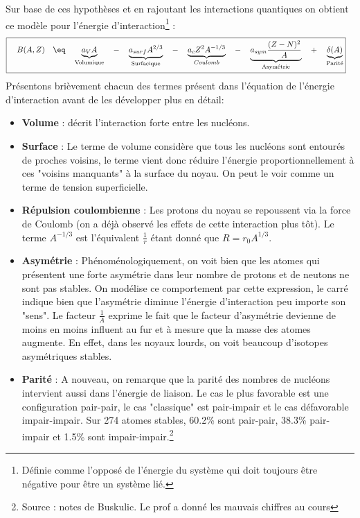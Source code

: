 Sur base de ces hypothèses et en rajoutant les interactions quantiques on obtient ce modèle pour l'énergie d'interaction\footnote{Définie comme l'opposé de l'énergie du système qui doit toujours être négative pour être un système lié.} :
\begin{equation}
\boxed{
    \quad B(A,Z) \quad\eq\quad
    \underbrace{a_V A}_{\text{Volumique}}
    \quad -\quad
    \underbrace{a_{surf} A^{2/3}}_{\text{Surfacique}}
    \quad-\quad
    \underbrace{a_c Z^2 A^{-1/3 }}_{Coulomb}
    \quad-\quad 
    \underbrace{a_{sym}\frac{(Z-N)^2}{A}}_{\text{Asymétrie}}
    \quad+\quad 
    \underbrace{\delta(A)}_{\text{Parité}}}\quad
    \label{B}
\end{equation}
Présentons brièvement chacun des termes présent dans l'équation de l'énergie d'interaction avant de les développer plus en détail:
\begin{itemize}[label = $\bullet$]
    \item \textbf{Volume} : décrit l'interaction forte entre les nucléons.
    
    \item \textbf{Surface} : Le terme de volume considère que tous les nucléons sont entourés de proches voisins, le terme vient donc réduire l'énergie proportionnellement à ces "voisins manquants" à la surface du noyau. On peut le voir comme un terme de tension superficielle.
    
    \item \textbf{Répulsion coulombienne} : Les protons du noyau se repoussent via la force de Coulomb (on a déjà observé les effets de cette interaction plus tôt). Le terme $A^{-1/3}$ est l'équivalent $\frac{1}{r}$ étant donné que $R=r_0A^{1/3}$.
    
    \item \textbf{Asymétrie} : Phénoménologiquement, on voit bien que les atomes qui présentent une  forte asymétrie dans leur nombre de protons et de neutons ne sont pas stables. On modélise ce comportement par cette expression, le carré indique bien que l'asymétrie diminue l'énergie d'interaction peu importe son "sens". Le facteur $\frac{1}{A}$ exprime le fait que le facteur d'asymétrie devienne de moins en moins influent au fur et à mesure que la masse des atomes augmente. En effet, dans les noyaux lourds, on voit beaucoup d'isotopes asymétriques stables.
    
    \item \textbf{Parité} : A nouveau, on remarque que la parité des nombres de nucléons intervient aussi dans l'énergie de liaison. Le cas le plus favorable est une configuration pair-pair, le cas "classique" est pair-impair et le cas défavorable impair-impair. Sur 274 atomes stables, 60.2\% sont pair-pair, 38.3\% pair-impair et 1.5\% sont impair-impair.\footnote{Source : notes de Buskulic. Le prof a donné les mauvais chiffres au cours}
\end{itemize}


